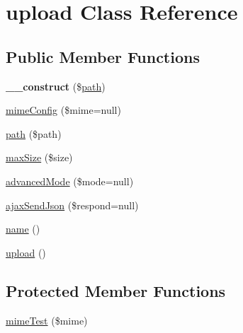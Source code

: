 \hypertarget{classupload}{\section{upload Class Reference}
\label{classupload}
}
\subsection*{Public Member Functions}
\begin{DoxyCompactItemize}
\item 
\hypertarget{classupload_a03853ceaa393e487835b287de58aba5a}{{\bfseries \-\_\-\-\_\-construct} (\$\hyperlink{classupload_a252353d1d7a5daf38f93859bc7dccccf}{path})}\label{classupload_a03853ceaa393e487835b287de58aba5a}

\item 
\hyperlink{classupload_a186afde49d0e262c66f8f5bdefe42cb4}{mime\-Config} (\$mime=null)
\item 
\hyperlink{classupload_a252353d1d7a5daf38f93859bc7dccccf}{path} (\$path)
\item 
\hyperlink{classupload_a8496ccdff0c6ca5869aa5cf6d0adf7fc}{max\-Size} (\$size)
\item 
\hyperlink{classupload_a5703de110a95a505c2ffd20a1627da89}{advanced\-Mode} (\$mode=null)
\item 
\hyperlink{classupload_ab22a9068029ed1bb11aa9e0cd62bc434}{ajax\-Send\-Json} (\$respond=null)
\item 
\hyperlink{classupload_a4b516aaa5fa38da4fed24ab6001627e2}{name} ()
\item 
\hyperlink{classupload_a160ae63d11b56d3190b172facb43a343}{upload} ()
\end{DoxyCompactItemize}
\subsection*{Protected Member Functions}
\begin{DoxyCompactItemize}
\item 
\hyperlink{classupload_aa9622d0f468253f04aa122505a089a86}{mime\-Test} (\$mime)
\end{DoxyCompactItemize}

